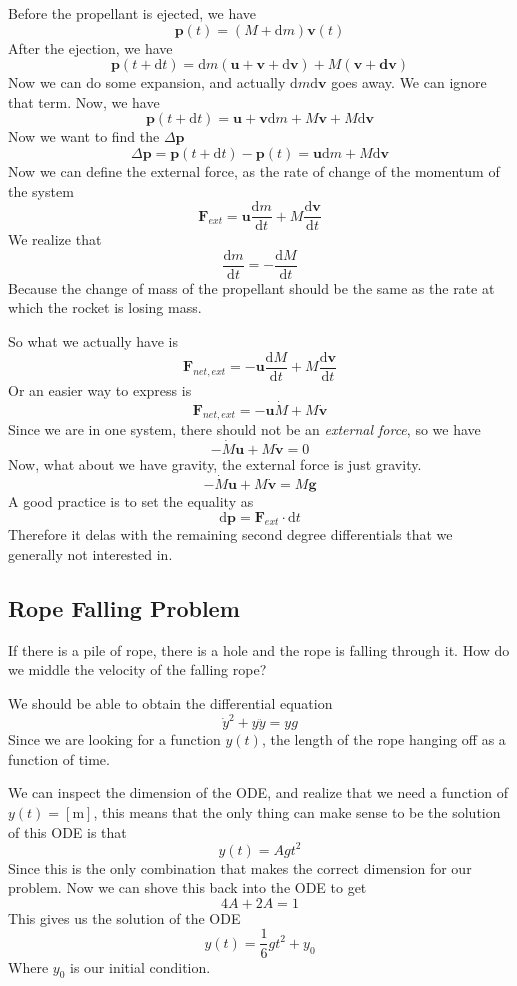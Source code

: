 \documentclass[12pt]{article}
\newcommand{\dydx}[2]{\frac{\text{d} #1}{\text{d} #2}}
\newcommand{\sqbkt}[1]{\left[ #1 \right]}
\newcommand{\paren}[1]{\left( #1 \right)}
\begin{document}
Before the propellant is ejected, we have
\[
\mathbf{p}(t) = \paren{M+\text{d}m}\mathbf{v}(t)
\]
After the ejection, we have
\[
\mathbf{p}(t+\text{d}t) = \text{d}m\paren{\mathbf{u}+\mathbf{v}+\text{d}\mathbf{v}} + M\paren{\mathbf{v+\text{d}\mathbf{v}}}
\]
Now we can do some expansion, and actually $\text{d}m\text{d}\mathbf{v}$ goes away. We can ignore that term. Now, we have
\[
\mathbf{p}(t+\text{d}t) = \mathbf{u} +\mathbf{v}\text{d}m + M\mathbf{v}+M\text{d}\mathbf{v}
\]
Now we want to find the $\Delta \mathbf{p}$
\[
\Delta \mathbf{p} = \mathbf{p}(t+\text{d}t)  - \mathbf{p}(t) = \mathbf{u}\text{d}m + M\text{d}\mathbf{v}
\]
Now we can define the external force, as the rate of change of the momentum of the system
\[
\mathbf{F}_{ext} = \mathbf{u}\frac{\text{d}m}{\text{d}t} + M\frac{ \text{d}\mathbf{v}}{\text{d}t}
\]
We realize that
\[
\dydx{m}{t} = - \dydx{M}{t}
\]
Because the change of mass of the propellant should be the same as the rate at which the rocket is losing mass. 

So what we actually have is
\[
\mathbf{F}_{net, ext} = -\mathbf{u}\frac{\text{d}M}{\text{d}t} + M\frac{ \text{d}\mathbf{v}}{\text{d}t}
\]
Or an easier way to express is
\[
\mathbf{F}_{net,ext} = -\mathbf{u}\dot{M} + M\dot{\mathbf{v}}
\]
Since we are in one system, there should not be an \textit{external force}, so we have
\[
-\dot{M}\mathbf{u} +  M\dot{\mathbf{v}} = 0
\]
Now, what about we have gravity, the external force is just gravity.
\[
-\dot{M}\mathbf{u} +  M\dot{\mathbf{v}} = M\mathbf{g}
\]
A good practice is to set the equality as
\[
\text{d}\mathbf{p} = \mathbf{F}_{ext}\cdot \text{d}t
\]
Therefore it delas with the remaining second degree differentials that we generally not interested in. 

\subsection{Rope Falling Problem}
If there is a pile of rope, there is a hole and the rope is falling through it. How do we middle the velocity of the falling rope?

We should be able to obtain the differential equation
\[
\dot{y}^2 + y\ddot{y} = yg
\]
Since we are looking for a function $y(t)$, the length of the rope hanging off as a function of time. 

We can inspect the dimension of the ODE, and realize that we need a function of $y(t) = \sqbkt{\text{m}}$, this means that the only thing can make sense to be the solution of this ODE is that
\[
y(t) = Agt^2
\]
Since this is the only combination that makes the correct dimension for our problem. Now we can shove this back into the ODE to get
\[
4A + 2A = 1
\]
This gives us the solution of the ODE
\[
y(t) = \frac{1}{6}gt^2 + y_0
\]
Where $y_0$ is our initial condition. 
\end{document}

